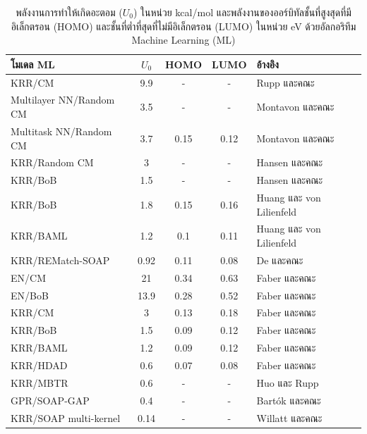 \begin{table}[H]
    \begin{threeparttable}[b]
    \centering
    \caption{พลังงานการทำให้เกิดอะตอม ($U_{0}$) ในหน่วย kcal/mol และพลังงานของออร์บิทัลชั้นที่สูงสุดที่มีอิเล็กตรอน (HOMO) 
    และชั้นที่ต่ำที่สุดที่ไม่มีอิเล็กตรอน (LUMO) ในหน่วย eV ด้วยอัลกอริทึม Machine Learning (ML)}
    \label{tab:pred_ener_atom_orb_ml}
    \begin{tabular}{lcccl}
    \toprule
    \textbf{โมเดล ML} &\textbf{$U_{0}$} &HOMO &LUMO &\textbf{อ้างอิง} \\
    \midrule
    KRR/CM\tnote{1} &9.9 &- &- &Rupp และคณะ\autocite{rupp2012} \\
    Multilayer NN/Random CM\tnote{1} &3.5 &- &- &Montavon และคณะ\autocite{montavon2012} \\
    Multitask NN/Random CM\tnote{2} &3.7 &0.15 &0.12 &Montavon และคณะ\autocite{montavon2013} \\
    KRR/Random CM\tnote{1} &3 &- &- &Hansen และคณะ\autocite{hansen2013} \\
    KRR/BoB\tnote{1} &1.5 &- &- &Hansen และคณะ\autocite{hansen2015} \\
    KRR/BoB\tnote{2} &1.8 &0.15 &0.16 &Huang และ von Lilienfeld\autocite{huang2016} \\
    KRR/BAML\tnote{2} &1.2 &0.1 &0.11 &Huang และ von Lilienfeld\autocite{huang2016} \\
    KRR/REMatch-SOAP\tnote{2} &0.92 &0.11 &0.08 &De และคณะ\autocite{de2016} \\
    EN/CM\tnote{3} &21 &0.34 &0.63 &Faber และคณะ\autocite{faber2017} \\
    EN/BoB\tnote{3} &13.9 &0.28 &0.52 &Faber และคณะ\autocite{faber2017} \\
    KRR/CM\tnote{3} &3 &0.13 &0.18 &Faber และคณะ\autocite{faber2017} \\
    KRR/BoB\tnote{3} &1.5 &0.09 &0.12 &Faber และคณะ\autocite{faber2017} \\
    KRR/BAML\tnote{3} &1.2 &0.09 &0.12 &Faber และคณะ\autocite{faber2017} \\
    KRR/HDAD\tnote{3} &0.6 &0.07 &0.08 &Faber และคณะ\autocite{faber2017} \\
    KRR/MBTR\tnote{2} &0.6 &- &- &Huo และ Rupp\autocite{huo2022} \\
    GPR/SOAP-GAP\tnote{2} &0.4 &- &- &Bart\'{o}k และคณะ\autocite{bartok2017} \\
    KRR/SOAP multi-kernel\tnote{3} &0.14 &- &- &Willatt และคณะ\autocite{willatt2018} \\

\end{tabular}
\end{threeparttable}
\end{table}

